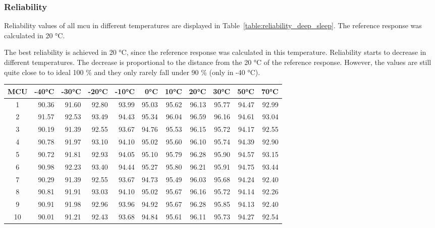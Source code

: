 \subsubsection*{Reliability}

Reliability values of all \gls{mcu} in different temperatures are displayed in Table~\ref{table:reliability_deep_sleep}. The reference response was calculated in 20 °C.

The best reliability is achieved in 20 °C, since the reference response was calculated in this temperature. Reliability starts to decrease in different temperatures. The decrease is proportional to the distance from the 20 °C of the reference response. However, the values are still quite close to to ideal 100 \% and they only rarely fall under 90 \% (only in -40 °C).

\begin{table}[ht!]
    \centering
    \begin{tabular}{c||rrrrrrrrrr}
    \toprule
    \textbf{MCU} & \textbf{-40°C} & \textbf{-30°C} & \textbf{-20°C} & \textbf{-10°C} & \textbf{0°C} & \textbf{10°C} & \textbf{20°C} & \textbf{30°C} & \textbf{50°C} & \textbf{70°C} \\
    \midrule
    1    &  90.36 &  91.60 &  92.80 &  93.99 & 95.03 & 95.62 & 96.13 & 95.77 & 94.47 & 92.99 \\
    2    &  91.57 &  92.53 &  93.49 &  94.43 & 95.34 & 96.04 & 96.59 & 96.16 & 94.61 & 93.04 \\
    3    &  90.19 &  91.39 &  92.55 &  93.67 & 94.76 & 95.53 & 96.15 & 95.72 & 94.17 & 92.55 \\
    4    &  90.78 &  91.97 &  93.10 &  94.10 & 95.02 & 95.60 & 96.10 & 95.74 & 94.39 & 92.90 \\
    5    &  90.72 &  91.81 &  92.93 &  94.05 & 95.10 & 95.79 & 96.28 & 95.90 & 94.57 & 93.15 \\
    6    &  90.98 &  92.23 &  93.40 &  94.44 & 95.27 & 95.80 & 96.21 & 95.91 & 94.75 & 93.44 \\
    7    &  90.29 &  91.39 &  92.55 &  93.67 & 94.73 & 95.49 & 96.03 & 95.68 & 94.24 & 92.40 \\
    8    &  90.81 &  91.91 &  93.03 &  94.10 & 95.02 & 95.67 & 96.16 & 95.72 & 94.14 & 92.26 \\
    9    &  90.91 &  91.98 &  92.96 &  93.96 & 94.92 & 95.67 & 96.28 & 95.85 & 94.13 & 92.40 \\
    10   &  90.01 &  91.21 &  92.43 &  93.68 & 94.84 & 95.61 & 96.11 & 95.73 & 94.27 & 92.54 \\

\end{tabular}
\end{table}
